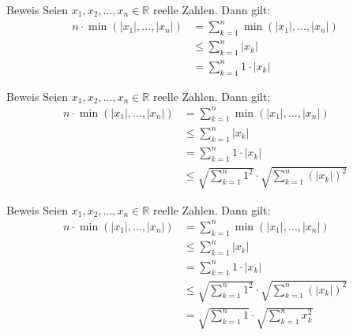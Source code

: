 \documentclass[10pt]{beamer}
\def\bR{\mathbb{R}}
\begin{document}
\begin{frame}{Beweis}
    Seien \( x_{1}, x_{2}, \ldots, x_{n} \in \bR \) reelle Zahlen. Dann gilt:
    \begin{align*}
        n \cdot \min\left( \left\vert x_{1} \right\vert, \ldots, \left\vert x_{n} \right\vert \right)
        & = \sum_{k = 1}^{n} \min\left( \left\vert x_{1} \right\vert, \ldots, \left\vert x_{n} \right\vert \right) \\
        & \leq \sum_{k = 1}^{n} \left\vert x_{k} \right\vert \\
        & = \sum_{k = 1}^{n} 1 \cdot \left\vert x_{k} \right\vert
    \end{align*}
\end{frame}



\begin{frame}{Beweis}
    Seien \( x_{1}, x_{2}, \ldots, x_{n} \in \bR \) reelle Zahlen. Dann gilt:
    \begin{align*}
        n \cdot \min\left( \left\vert x_{1} \right\vert, \ldots, \left\vert x_{n} \right\vert \right)
        & = \sum_{k = 1}^{n} \min\left( \left\vert x_{1} \right\vert, \ldots, \left\vert x_{n} \right\vert \right) \\
        & \leq \sum_{k = 1}^{n} \left\vert x_{k} \right\vert \\
        & = \sum_{k = 1}^{n} 1 \cdot \left\vert x_{k} \right\vert \\
        & \leq \sqrt{\sum_{k = 1}^{n} 1^{2}} \cdot \sqrt{\sum_{k = 1}^{n} \left( \left\vert x_{k} \right\vert \right)^{2}}
    \end{align*}
\end{frame}



\begin{frame}{Beweis}
    Seien \( x_{1}, x_{2}, \ldots, x_{n} \in \bR \) reelle Zahlen. Dann gilt:
    \begin{align*}
        n \cdot \min\left( \left\vert x_{1} \right\vert, \ldots, \left\vert x_{n} \right\vert \right)
        & = \sum_{k = 1}^{n} \min\left( \left\vert x_{1} \right\vert, \ldots, \left\vert x_{n} \right\vert \right) \\
        & \leq \sum_{k = 1}^{n} \left\vert x_{k} \right\vert \\
        & = \sum_{k = 1}^{n} 1 \cdot \left\vert x_{k} \right\vert \\
        & \leq \sqrt{\sum_{k = 1}^{n} 1^{2}} \cdot \sqrt{\sum_{k = 1}^{n} \left( \left\vert x_{k} \right\vert \right)^{2}} \\
        & = \sqrt{\sum_{k = 1}^{n} 1 } \cdot \sqrt{\sum_{k = 1}^{n} x_{k}^{2}}
    \end{align*}
\end{frame}
\end{document}
